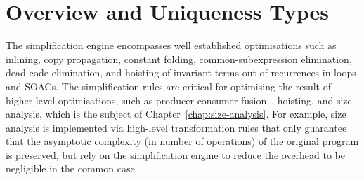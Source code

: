 \renewcommand{\sp}{~~~~~}
\newcommand{\ft}{\phi}
\newcommand{\fts}{\varphi}
\newcommand{\tty}{\rho}
\newcommand{\utty}{\hat{\rho}}
\newcommand{\sembox}[1]{\hfill \normalfont \mbox{\fbox{\(#1\)}}}
\newcommand{\sempart}[2]{\textrm{\textit{#1 \sembox{#2}}}}
\newcommand{\vdb}{\vd_\textrm{b}}
\newcommand{\vde}{\vd_\textrm{e}}
\newcommand{\vdp}{\vd_\textrm{p}}
\newcommand{\vdhp}{\vd_{\hat{\textrm{p}}}}
\newcommand{\vdP}{\vd_\textrm{P}}
\newcommand{\vda}{\vd_\textrm{a}}
\newcommand{\fracc}[2]{\begin{eqnarray} \frac{\begin{array}{c} #1
    \end{array}}{\begin{array}{c} #2 \end{array}} \end{eqnarray}}
\newcommand{\fraccn}[2]{\refstepcounter{equation}\mbox{$\frac{\begin{array}{c} #1 \end{array}}{\begin{array}{c} #2 \end{array}}$}~(\arabic{equation})}
\newcommand{\fraccc}[2]{\mbox{$\frac{\begin{array}{c} #1 \end{array}}{\begin{array}{c} #2 \end{array}}$}}
\newcommand{\fn}{\ensuremath{\lambda}}
\newcommand{\Fn}[3]{\fn#2:~#1~\rightarrow #3}
\newcommand{\FnU}[2]{\fn#1~\rightarrow #2}
\newcommand{\ubar}[1]{\underline{#1}}
\newcommand{\utau}{\hat{\tau}}
\newcommand{\etau}{\ubar{\tau}}
\newcommand{\opty}{\ubar{\phi}}
\newcommand{\Fun}[4]{\mbox{\lstinline[mathescape]!let\ #1\ #2:#3 =\ #4!}}

\chapter{Overview and Uniqueness Types}

The simplification engine encompasses well established optimisations
such as inlining, copy propagation, constant folding,
common-subexpression elimination, dead-code elimination, and hoisting
of invariant terms out of recurrences in loops and SOACs.  The
simplification rules are critical for optimising the result of
higher-level optimisations, such as producer-consumer
fusion~\cite{henriksen2014exploiting,henriksen2013t2}, hoisting, and
size analysis, which is the subject of
Chapter~\ref{chap:size-analysis}.  For example, size analysis is
implemented via high-level transformation rules that only guarantee
that the asymptotic complexity (in number of operations) of the
original program is preserved, but rely on the simplification engine
to reduce the overhead to be negligible in the common case.

